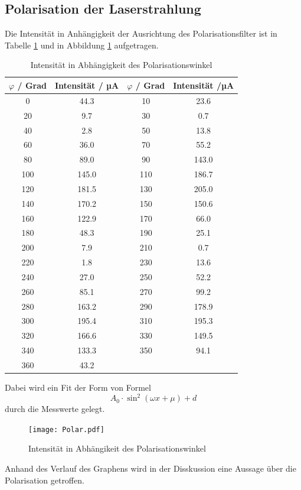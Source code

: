 \subsection{Polarisation der Laserstrahlung}
Die Intensität in Anhängigkeit der Ausrichtung des Polarisationsfilter ist in Tabelle \ref{tab:Pol} und in Abbildung \ref{fig:Pol} aufgetragen.
\begin{table}
  \centering
  \begin{tabular}{c c | c c}
    \toprule
    $\varphi$ / Grad & Intensität / µA & $\varphi$ / Grad & Intensität /µA \\
    \midrule
	0	& 44.3	& 10	& 23.6	\\
	20	& 9.7	& 30	& 0.7	\\
	40	& 2.8	& 50	& 13.8	\\
	60	& 36.0	& 70	& 55.2	\\
	80	& 89.0	& 90	& 143.0	\\
	100	& 145.0	& 110	& 186.7	\\
	120	& 181.5	& 130	& 205.0	\\
	140	& 170.2	& 150	& 150.6	\\
	160	& 122.9	& 170	& 66.0	\\
	180	& 48.3	& 190	& 25.1	\\
	200	& 7.9	& 210	& 0.7	\\
	220	& 1.8	& 230	& 13.6	\\
	240	& 27.0	& 250	& 52.2	\\
	260	& 85.1	& 270	& 99.2	\\
	280	& 163.2	& 290	& 178.9	\\
	300	& 195.4	& 310	& 195.3	\\
	320	& 166.6	& 330	& 149.5	\\
	340	& 133.3 & 350	& 94.1	\\
	360	& 43.2	\\
    \bottomrule
  \end{tabular}
  \caption{Intensität in Abhängigkeit des Polarisationswinkel}
  \label{tab:Pol}
\end{table}
Dabei wird ein Fit der Form von Formel 
\begin{equation}
  A_0 \cdot \sin^2(\omega x + \mu) + d
  \label{eqn:pfit}
\end{equation}
durch die Messwerte gelegt. 
\begin{figure}
  \centering
  \texttt{[image: Polar.pdf]}
  \caption{Intensität in Abhängikeit des Polarisationswinkel}
  \label{fig:Pol}
\end{figure}
Anhand des Verlauf des Graphens wird in der Disskussion eine Aussage über die Polarisation getroffen. 
